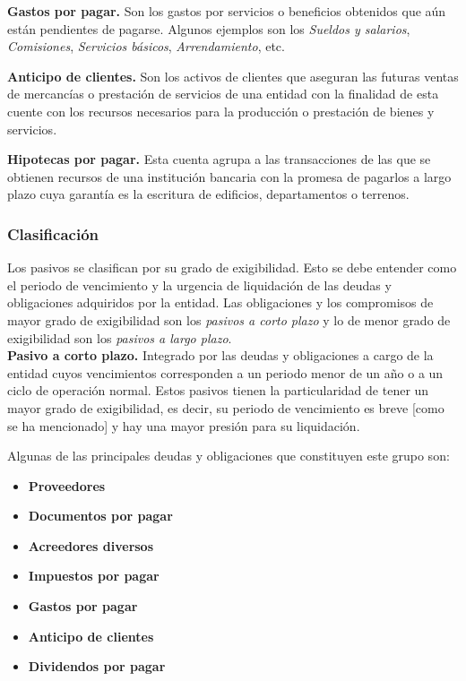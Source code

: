 \documentclass[12pt]{article}
\begin{document}
			\textbf{Gastos por pagar.} Son los gastos por servicios o beneficios obtenidos que aún están pendientes de pagarse. Algunos ejemplos son los \emph{Sueldos y salarios}, \emph{Comisiones}, \emph{Servicios básicos}, \emph{Arrendamiento}, etc.

			\textbf{Anticipo de clientes.} Son los activos de clientes que aseguran las futuras ventas de mercancías o prestación de servicios de una entidad con la finalidad de esta cuente con los recursos necesarios para la producción o prestación de bienes y servicios.

			\textbf{Hipotecas por pagar.} Esta cuenta agrupa a las transacciones de las que se obtienen recursos de una institución bancaria con la promesa de pagarlos a largo plazo cuya garantía es la escritura de edificios, departamentos o terrenos.


		\subsubsection{Clasificación}

			Los pasivos se clasifican por su grado de exigibilidad. Esto se debe entender como el periodo de vencimiento y la urgencia de liquidación de las deudas y obligaciones adquiridos por la entidad. Las obligaciones y los compromisos de mayor grado de exigibilidad son los \emph{pasivos a corto plazo} y lo de menor grado de exigibilidad son los \emph{pasivos a largo plazo}. \\

			\textbf{Pasivo a corto plazo.} Integrado por las deudas y obligaciones a cargo de la entidad cuyos vencimientos corresponden a un periodo menor de un año o a un ciclo de operación normal. Estos pasivos tienen la particularidad de tener un mayor grado de exigibilidad, es decir, su periodo de vencimiento es breve [como se ha mencionado] y hay una mayor presión para su liquidación.
				
			Algunas de las principales deudas y obligaciones que constituyen este grupo son:

			\begin{itemize}
				\item \textbf{Proveedores}
				\item \textbf{Documentos por pagar}
				\item \textbf{Acreedores diversos}
				\item \textbf{Impuestos por pagar}
				\item \textbf{Gastos por pagar}
				\item \textbf{Anticipo de clientes}
				\item \textbf{Dividendos por pagar}
			\end{itemize}
\end{document}
